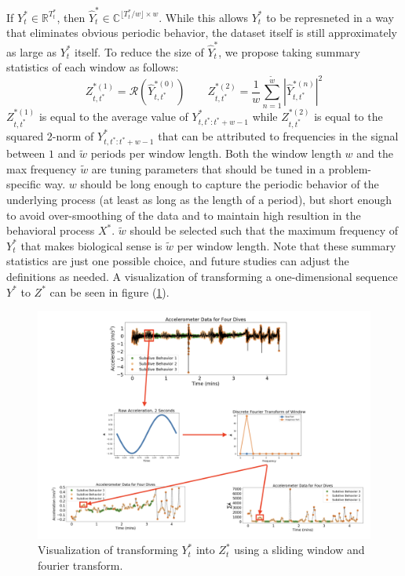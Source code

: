 If $Y^*_t \in \mathbb{R}^{T^*_t}$, then $\hat{Y}_t^* \in \mathbb{C}^{\lfloor T^*_t / w \rfloor \times w}$. While this allows $Y^*_t$ to be represneted in a way that eliminates obvious periodic behavior, the dataset itself is still approximately as large as $Y^*_t$ itself. To reduce the size of $\hat{Y}^*_t$, we propose taking summary statistics of each window as follows:
%
$$Z_{t,t^*}^{*(1)} = \mathcal{R}\left(\hat{Y}^{*(0)}_{t,t^*}\right) \qquad Z_{t,t^*}^{*(2)} = \frac{1}{w}\sum_{n=1}^{\tilde{w}}|\hat{Y}^{*(n)}_{t,t^*}|^2$$
%
$Z_{t,t^*}^{*(1)}$ is equal to the average value of $Y_{t,t^*:t^*+w-1}^*$ while $Z_{t,t^*}^{*(2)}$ is equal to the squared 2-norm of $Y_{t,t^*:t^*+w-1}^*$ that can be attributed to frequencies in the signal between $1$ and $\tilde{w}$ periods per window length. Both the window length $w$ and the max frequency $\tilde{w}$ are tuning parameters that should be tuned in a problem-specific way. $w$ should be long enough to capture the periodic behavior of the underlying process (at least as long as the length of a period), but short enough to avoid over-smoothing of the data and to maintain high resultion in the behavioral process $X^*$. $\tilde{w}$ should be selected such that the maximum frequency of $Y_t^*$ that makes biological sense is $\tilde{w}$ per window length. Note that these summary statistics are just one possible choice, and future studies can adjust the definitions as needed. A visualization of transforming a one-dimensional sequence $Y^*$ to $Z^*$ can be seen in figure (\ref{fig:fourier_example}).

\begin{figure}[h!]
	\centering
	\includegraphics[width=7.5in]{../../Plots/fourier_transform.png}
	\caption{Visualization of transforming $Y^*_t$ into $Z^*_t$ using a sliding window and fourier transform.}
	\label{fig:fourier_example}
\end{figure}

